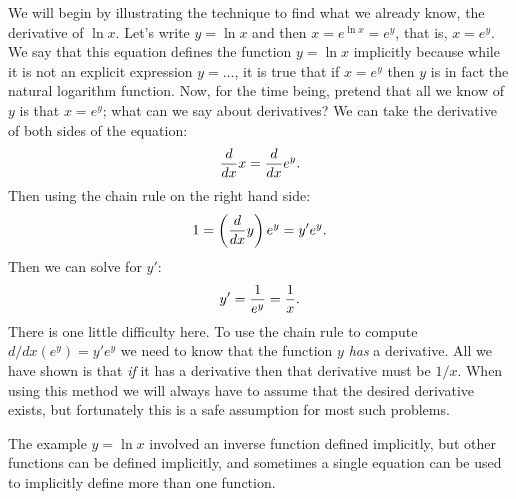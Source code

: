 We will begin by illustrating the technique to find what we already
know, the derivative of $\ln x$. Let's write $y=\ln x$ and then $
x=e^{\ln x}=e^y$, that is, $x=e^y$. We say that this equation
defines the function $y=\ln x$ implicitly because while it is not an
explicit expression $y=\ldots$, it is true that if $x=e^y$ then
$y$ is in fact the natural logarithm function. Now, for the time
being, pretend that all we know of $y$ is that $x=e^y$; what can
we say about derivatives? We can take the derivative of both sides of
the equation:
$${d\over dx}x={d\over dx}e^y.$$
Then using the chain rule on the right hand side:
$$1 = \left({d\over dx}y\right) e^y = y'e^y.$$
Then we can solve for $y'$:
$$y'={1\over e^y} = {1\over x}.$$
There is one little difficulty here. To use the chain rule to compute 
$d/dx(e^y)=y'e^y$ we need to know that the function $y$ {\it has\/} a
derivative. All we have shown is that {\it if\/} it has a derivative
then that derivative must be $1/x$. When using this method we will
always have to assume that the desired derivative exists, but
fortunately this is a safe assumption for most such problems. 

The example $y=\ln x$ involved an inverse function defined implicitly,
but other functions can be defined implicitly, and sometimes a single
equation can be used to implicitly define more than one
function. 

